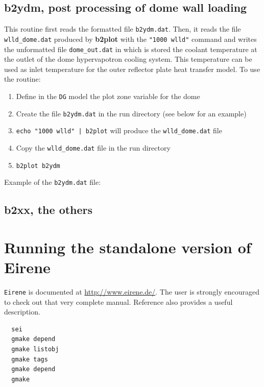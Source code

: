 \documentclass[a4paper,10pt]{report}
\newcommand{\btwoplot}{{\bf b2plot} }
\begin{document}
\newpage
\section{b2ydm, post processing of dome wall loading}
\label{sec:b2ydm}

This routine first reads the formatted file {\tt b2ydm.dat}. Then, it reads the file {\tt wlld\_dome.dat} produced by \btwoplot with the {\tt "1000 wlld"} command and writes the unformatted file {\tt dome\_out.dat} in which is stored the coolant temperature at the outlet of the dome hypervapotron cooling system. This temperature can be used as inlet temperature for the outer reflector plate heat transfer model.
To use the routine:
\begin{enumerate}
  \item Define in the {\tt DG} model the plot zone variable for the dome
  \item Create the file {\tt b2ydm.dat} in the run directory (see below for an example)
  \item {\tt echo "1000 wlld" | b2plot} will produce the {\tt wlld\_dome.dat} file
  \item Copy the {\tt wlld\_dome.dat} file in the run directory
  \item {\tt b2plot b2ydm}
\end{enumerate}

Example of the {\tt b2ydm.dat} file:\\


\newpage
\section{b2xx, the others}

\chapter{Running the standalone version of Eirene}
\label{cha:standaloneeirene}

{\tt Eirene} is documented at
\href{http://www.eirene.de/}{http://www.eirene.de/}.
The user is strongly encouraged to check out that very complete manual.
Reference \cite{Reiter2005} also provides a useful description.

\begin{verbatim}
  sei
  gmake depend
  gmake listobj
  gmake tags
  gmake depend
  gmake
\end{verbatim}
\end{document}
